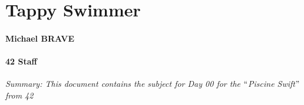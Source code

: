 \documentclass[12pt]{report}
\begin{document}
\vspace{\baselineskip}

\vspace{\baselineskip}

\vspace{\baselineskip}

\vspace{\baselineskip}

\vspace{\baselineskip}
\par

\section*{Tappy Swimmer}

\vspace{\baselineskip}

\vspace{\baselineskip}
\paragraph*{Michael BRAVE }
\paragraph*{42 Staff }

\vspace{\baselineskip}

\vspace{\baselineskip}

\vspace{\baselineskip}

\vspace{\baselineskip}
\begin{Center}
\textit{Summary: This document contains the subject for Day 00 for the $``$Piscine Swift$"$  from 42}
\end{Center}\par


\vspace{\baselineskip}

\vspace{\baselineskip}

\vspace{\baselineskip}

\vspace{\baselineskip}

\vspace{\baselineskip}
\end{document}
